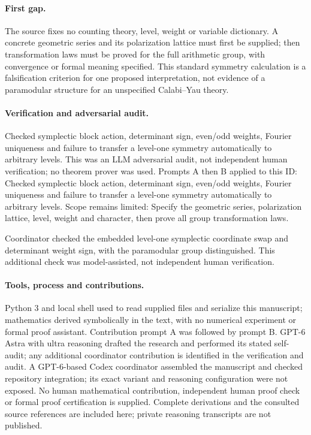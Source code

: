 \documentclass[11pt]{article}
\begin{document}
\paragraph{First gap.}The source fixes no counting theory, level, weight or variable dictionary. A concrete geometric series and its polarization lattice must first be supplied; then transformation laws must be proved for the full arithmetic group, with convergence or formal meaning specified. This standard symmetry calculation is a falsification criterion for one proposed interpretation, not evidence of a paramodular structure for an unspecified Calabi--Yau theory.

\paragraph{Verification and adversarial audit.}
Checked symplectic block action, determinant sign, even/odd weights, Fourier uniqueness and failure to transfer a level-one symmetry automatically to arbitrary levels. This was an LLM adversarial audit, not independent human verification; no theorem prover was used. Prompts A then B applied to this ID: Checked symplectic block action, determinant sign, even/odd weights, Fourier uniqueness and failure to transfer a level-one symmetry automatically to arbitrary levels. Scope remains limited: Specify the geometric series, polarization lattice, level, weight and character, then prove all group transformation laws.

Coordinator checked the embedded level-one symplectic coordinate swap and determinant weight sign, with the paramodular group distinguished. This additional check was model-assisted, not independent human verification.

\paragraph{Tools, process and contributions.}
Python 3 and local shell used to read supplied files and serialize this manuscript; mathematics derived symbolically in the text, with no numerical experiment or formal proof assistant. Contribution prompt A was followed by prompt B. GPT-6 Astra with ultra reasoning drafted the research and performed its stated self-audit; any additional coordinator contribution is identified in the verification and audit. A GPT-6-based Codex coordinator assembled the manuscript and checked repository integration; its exact variant and reasoning configuration were not exposed. No human mathematical contribution, independent human proof check or formal proof certification is supplied. Complete derivations and the consulted source references are included here; private reasoning transcripts are not published.
\end{document}
